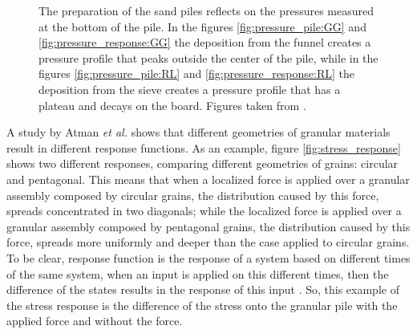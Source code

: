 \begin{figure}
    \caption{The preparation of the sand piles reflects on the pressures measured at the bottom of the pile. In the figures \ref{fig:pressure_pile:GG} and \ref{fig:pressure_response:GG} the deposition from the funnel creates a pressure profile that peaks outside the center of the pile, while in the figures \ref{fig:pressure_pile:RL} and \ref{fig:pressure_response:RL} the deposition from the sieve creates a pressure profile that has a plateau and decays on the board. Figures taken from \cite{Memories_in_Sand}.}
    \label{fig:pile_stress}
\end{figure}    


    A study by Atman \textit{et al.} \cite{Sensitivity_of_Stress_Response_Function_to_Packing_Preparation} shows that different geometries of granular materials result in different response functions. As an example, figure \ref{fig:stress_response} shows two different responses, comparing different geometries of grains: circular and pentagonal. This means that when a localized force is applied over a granular assembly composed by circular grains, the distribution caused by this force, spreads concentrated in two diagonals; while the localized force is applied over a granular assembly composed by pentagonal grains, the distribution caused by this force, spreads more uniformly and deeper than the case applied to circular grains. To be clear, response function is the response of a system based on different times of the same system, when an input is applied on this different times, then the difference of the states results in the response of this input \cite{The_Physics_of_Granular_Media}. So, this example of the stress response is the difference of the stress onto the granular pile with the applied force and without the force.

